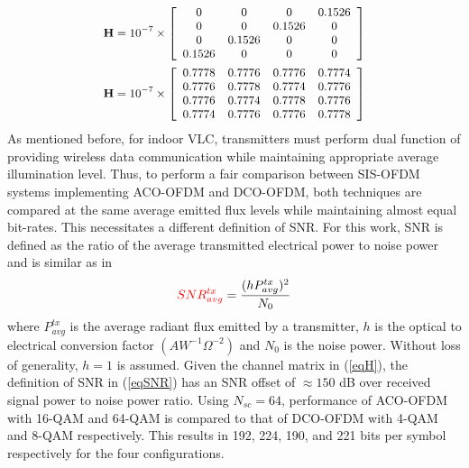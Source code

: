 \documentclass[12pt,letterpaper,onecolumn]{article} %
\newcommand{\vm}[1]{{\bf{#1}}}
\begin{document}
\begin{subequations}
\small
\begin{align}
	\vm{H} = 10^{-7}\times\left[
	                      \begin{array}{cccc}
												0&0&0&0.1526\\
												0&0&0.1526&0\\
												0&0.1526&0&0\\
												0.1526&0&0&0
												\end{array}
												\right]\label{eqHimr}\\
	\vm{H} = 10^{-7}\times\left[
	                      \begin{array}{cccc}
												0.7778&0.7776&0.7776&0.7774\\
												0.7776&0.7778&0.7774&0.7776\\
												0.7776&0.7774&0.7778&0.7776\\
												0.7774&0.7776&0.7776&0.7778
												\end{array}
												\right]\label{eqHnimr}
\end{align}
\label{eqH}
\end{subequations}
{\color{red}As mentioned before, for indoor VLC, transmitters must perform dual function of providing wireless data communication while maintaining appropriate average illumination level. Thus, to perform a fair comparison between SIS-OFDM systems implementing ACO-OFDM and DCO-OFDM, both techniques are compared at the same average emitted flux levels while maintaining almost equal bit-rates. This necessitates a different definition of SNR. For this work, SNR is defined as the ratio of the average transmitted electrical power to noise power and is similar as in \cite{fat13a}}
\begin{equation}
	\label{eqSNR}
	{\color{red}SNR^{tx}_{avg}} = \frac{(hP_{avg}^{tx})^2}{N_{0}}
\end{equation}
where $P_{avg}^{tx}$ is the average radiant flux emitted by a transmitter, $h$ is the optical to electrical conversion factor $(AW^{-1}\Omega^{-2})$ and $N_0$ is the noise power. Without loss of generality, $h=1$ is assumed. Given the channel matrix in (\ref{eqH}), the definition of SNR in (\ref{eqSNR}) has an SNR offset of $\approx 150$ dB over received signal power to noise power ratio. {\color{red}Using $N_{sc}=64$, performance of ACO-OFDM with 16-QAM and 64-QAM is compared to that of DCO-OFDM with 4-QAM and 8-QAM respectively. This results in 192, 224, 190, and 221 bits per symbol respectively for the four configurations.}
\end{document}
